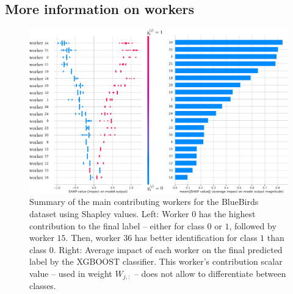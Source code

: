 \documentclass{cap2024}
\begin{document}



\subsection{More information on workers}

\begin{figure}[htb]
  \centering
  \includegraphics[width=\textwidth]{./../summary_plot_shap_all_bluebirds.pdf}
  \caption{Summary of the main contributing workers for the BlueBirds dataset using Shapley values. Left: Worker $0$ has the highest contribution to the final label -- either for class $0$ or $1$, followed by worker $15$. Then, worker $36$ has better identification for class $1$ than class $0$. Right: Average impact of each worker on the final predicted label by the XGBOOST classifier. This worker's contribution scalar value -- used in  weight $W_{j,:}$ -- does not allow to differentiate between classes.}
  \label{fig:shap_bluebirds}
\end{figure}
\end{document}
